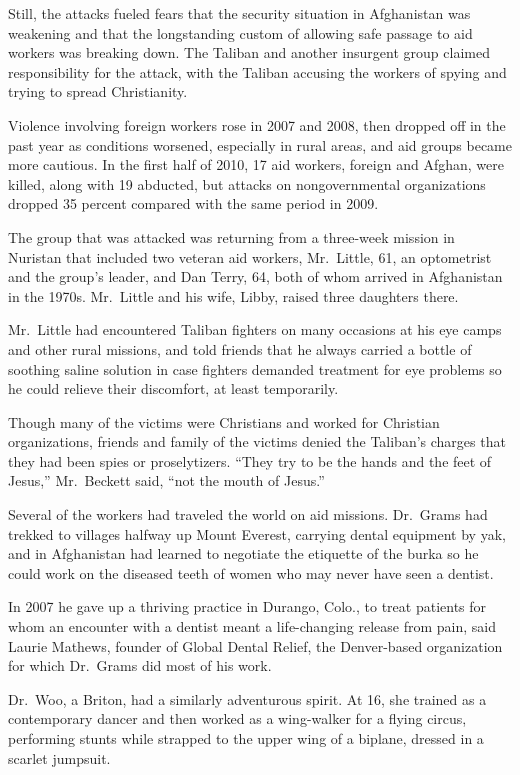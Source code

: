 ﻿\documentclass[12pt]{article}
\begin{document}
Still, the attacks fueled fears that the security situation in Afghanistan was weakening and that
the longstanding custom of allowing safe passage to aid workers was breaking down. The Taliban and
another insurgent group claimed responsibility for the attack, with the Taliban accusing the workers
of spying and trying to spread Christianity.

Violence involving foreign workers rose in 2007 and 2008, then dropped off in the past year as
conditions worsened, especially in rural areas, and aid groups became more cautious. In the first
half of 2010, 17 aid workers, foreign and Afghan, were killed, along with 19 abducted, but attacks
on nongovernmental organizations dropped 35 percent compared with the same period in 2009.

The group that was attacked was returning from a three-week mission in Nuristan that included two
veteran aid workers, Mr.~Little, 61, an optometrist and the group's leader, and Dan Terry, 64, both
of whom arrived in Afghanistan in the 1970s. Mr.~Little and his wife, Libby, raised three daughters
there.

Mr.~Little had encountered Taliban fighters on many occasions at his eye camps and other rural
missions, and told friends that he always carried a bottle of soothing saline solution in case
fighters demanded treatment for eye problems so he could relieve their discomfort, at least
temporarily.

Though many of the victims were Christians and worked for Christian organizations, friends and
family of the victims denied the Taliban's charges that they had been spies or proselytizers. ``They
try to be the hands and the feet of Jesus,'' Mr.~Beckett said, ``not the mouth of Jesus.''

Several of the workers had traveled the world on aid missions. Dr.~Grams had trekked to villages
halfway up Mount Everest, carrying dental equipment by yak, and in Afghanistan had learned to
negotiate the etiquette of the burka so he could work on the diseased teeth of women who may never
have seen a dentist.

In 2007 he gave up a thriving practice in Durango, Colo., to treat patients for whom an encounter
with a dentist meant a life-changing release from pain, said Laurie Mathews, founder of Global
Dental Relief, the Denver-based organization for which Dr.~Grams did most of his work.

Dr.~Woo, a Briton, had a similarly adventurous spirit. At 16, she trained as a contemporary dancer
and then worked as a wing-walker for a flying circus, performing stunts while strapped to the upper
wing of a biplane, dressed in a scarlet jumpsuit.
\end{document}
